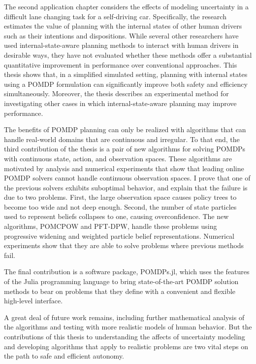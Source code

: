 \documentclass[12pt]{report}
\begin{document}
The second application chapter considers the effects of modeling uncertainty in a difficult lane changing task for a self-driving car.
Specifically, the research estimates the value of planning with the internal states of other human drivers such as their intentions and dispositions.
While several other researchers have used internal-state-aware planning methods to interact with human drivers in desirable ways, they have not evaluated whether these methods offer a substantial quantitative improvement in performance over conventional approaches.
This thesis shows that, in a simplified simulated setting, planning with internal states using a POMDP formulation can significantly improve both safety and efficiency simultaneously.
Moreover, the thesis describes an experimental method for investigating other cases in which internal-state-aware planning may improve performance.

The benefits of POMDP planning can only be realized with algorithms that can handle real-world domains that are continuous and irregular.
To that end, the third contribution of the thesis is a pair of new algorithms for solving POMDPs with continuous state, action, and observation spaces.
These algorithms are motivated by analysis and numerical experiments that show that leading online POMDP solvers cannot handle continuous observation spaces.
I prove that one of the previous solvers exhibits suboptimal behavior, and explain that the failure is due to two problems.
First, the large observation space causes policy trees to become too wide and not deep enough.
Second, the number of state particles used to represent beliefs collapses to one, causing overconfidence.
The new algorithms, POMCPOW and PFT-DPW, handle these problems using progressive widening and weighted particle belief representations.
Numerical experiments show that they are able to solve problems where previous methods fail.

The final contribution is a software package, POMDPs.jl, which uses the features of the Julia programming language to bring state-of-the-art POMDP solution methods to bear on problems that they define with a convenient and flexible high-level interface.

A great deal of future work remains, including further mathematical analysis of the algorithms and testing with more realistic models of human behavior. But the contributions of this thesis to understanding the affects of uncertainty modeling and developing algorithms that apply to realistic problems are two vital steps on the path to safe and efficient autonomy.
\end{document}
